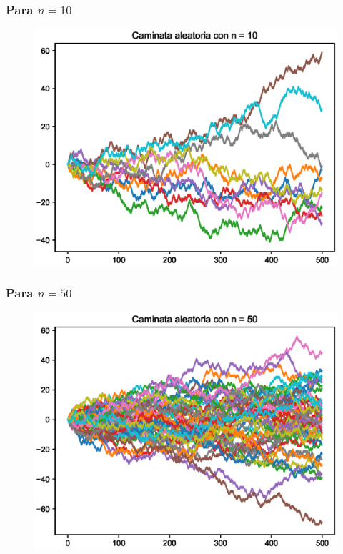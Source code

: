 \documentclass[12pt]{beamer}
\begin{document}
\begin{frame}
\frametitle{Para $n =  10$}
\begin{figure}
    \includegraphics[scale=0.55]{Imagenes/plot_caminata_aleatoria_02.eps}
\end{figure}
\end{frame}
\begin{frame}
\frametitle{Para $n =  50$}
\begin{figure}
    \includegraphics[scale=0.55]{Imagenes/plot_caminata_aleatoria_03.eps}
\end{figure}
\end{frame}
\end{document}
